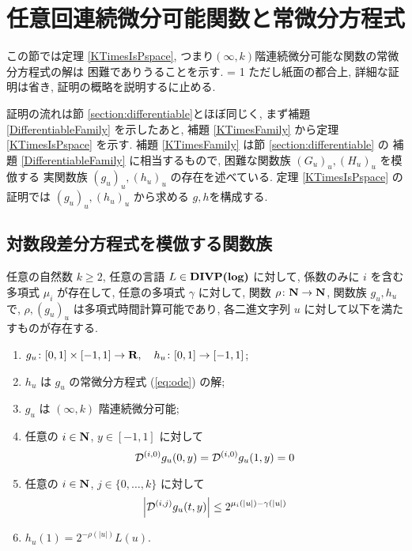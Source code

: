 \section{任意回連続微分可能関数と常微分方程式}

この節では定理 \ref{KTimesIsPspace}, 
つまり$(\infty, k)$階連続微分可能な関数の常微分方程式の解は
\DIVPlog 困難でありうることを示す.
\ifnum \proc = 1
ただし紙面の都合上, 詳細な証明は省き, 証明の概略を説明するに止める.
\fi


証明の流れは節 \ref{section:differentiable}とほぼ同じく, 
まず補題 \ref{DifferentiableFamily} を示したあと,
補題 \ref{KTimesFamily} から定理 \ref{KTimesIsPspace} を示す.
補題 \ref{KTimesFamily} は節 \ref{section:differentiable} の
補題 \ref{DifferentiableFamily} に相当するもので,
\DIVPlog 困難な関数族 $(G_u)_u, (H_u)_u$ を模倣する
実関数族 $(g_u)_u, (h_u)_u$ の存在を述べている.
定理 \ref{KTimesIsPspace} の証明では
$(g_u)_u, (h_u)_u$ から求める $g, h$を構成する.



\subsection{対数段差分方程式を模倣する関数族}

 \begin{lemma}
  \label{KTimesFamily}
  任意の自然数 $k \ge 2$,
  任意の言語 $L \in \text{\bf DIVP(log)}$ に対して,
  係数のみに $i$ を含む多項式 $\mu_i$ が存在して,
  任意の多項式 $\gamma$ に対して,
  関数 $\rho \colon \mathbf N \to \mathbf N$, 関数族 $g_u, h_u$ で,
  $\rho, (g_u)_u$ は多項式時間計算可能であり,
  各二進文字列 $u$ に対して以下を満たすものが存在する.
  \begin{enumerate}
   \item $g_u\colon [0,1] \times [-1,1]\to \mathbf R, \quad h_u\colon [0,1] \to [-1,1]$;
   \item $h_u$ は $g_u$ の常微分方程式 (\ref{eq:ode}) の解;
   \item $g_u$ は $(\infty, k)$ 階連続微分可能;
   \item 任意の $i \in \mathbf N$, $y \in [-1,1]$ に対して
	 \begin{equation*}
	  \mathcal D^{(i, 0)} g_u(0,y) = \mathcal D^{(i, 0)} g_u(1,y) = 0 
	 \end{equation*}
   \item 任意の $i \in \mathbf N$, $j \in \{0, \dots, k\}$ に対して
	 \begin{equation*}
	  \left|\mathcal D^{(i,j)} g_u(t,y)\right| \le 2^{\mu_i(|u|) - \gamma(|u|)}
	 \end{equation*}
	 \label{enum:inftyk}
   \item $h_u(1) = 2^{-\rho(|u|)}L(u)$.
  \end{enumerate}
 \end{lemma}


